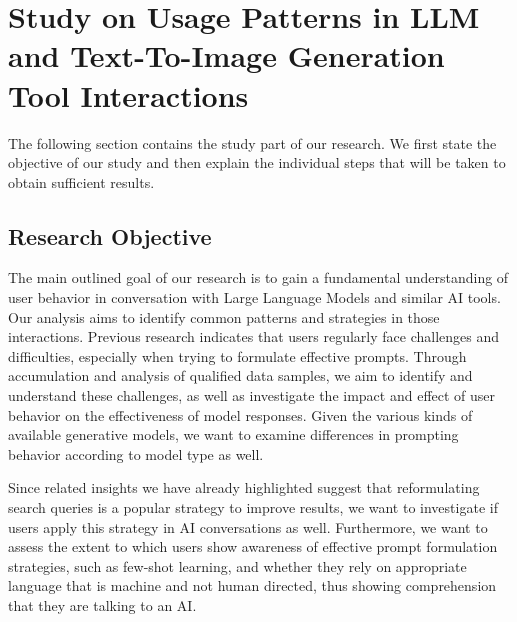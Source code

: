 \section{Study on Usage Patterns in LLM and Text-To-Image Generation Tool Interactions}
\label{sec:study-on-usage-patterns-in-llm-and-text-to-image-generation-tool-interactions}
The following section contains the study part of our research.
We first state the objective of our study and then explain the individual steps that will be
taken to obtain sufficient results.
\subsection{Research Objective}
\label{subsec:research-objective}
The main outlined goal of our research is to gain a fundamental understanding of user behavior in
conversation with Large Language Models and similar AI tools.
Our analysis aims to identify common patterns and strategies in those interactions.
Previous research indicates that users regularly face challenges and difficulties, especially
when trying to formulate effective prompts.
Through accumulation and analysis of qualified data samples, we aim to identify and understand these
challenges,
as well as investigate the impact and effect of user behavior on the effectiveness of model
responses.
Given the various kinds of available generative models, we want to examine differences in
prompting behavior according to model type as well.

Since related insights we have already highlighted suggest that reformulating search queries is a
popular strategy to improve results, we want to investigate if users apply this strategy in AI
conversations as well.
Furthermore, we want to assess the extent to which users show awareness of effective prompt
formulation strategies, such as few-shot learning, and whether they rely on appropriate language
that is machine and not human directed, thus showing comprehension that they are talking to an AI\@.

